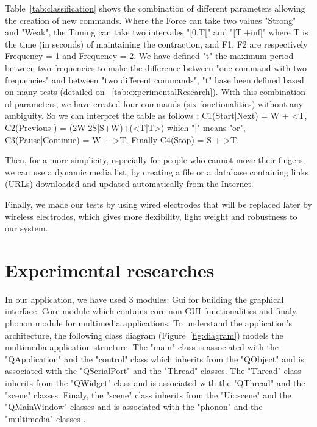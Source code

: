 \documentclass[conference]{IEEEtran}
\begin{document}
Table~\ref{tab:classification} shows the combination of different parameters allowing the creation of new commands. Where the Force can take two values 
"Strong" and "Weak", the Timing can take two intervales "[0,T[" and "[T,+inf[" where T is the time (in seconds) of maintaining the contraction, and F1, F2 are
respectively Frequency = 1 and Frequency = 2. We have defined "t" the maximum period between two frequencies to make the difference
between "one command with two frequencies" and between "two different commands", "t" hase been defined based on many tests (detailed on ~\ref{tab:experimentalResearch}).
With this combination of parameters, we have created four commands (six fonctionalities) without any ambiguity.
So we can interpret the table as follows : C1(Start|Next) =  W + <T, C2(Previous
) = (2W|2S|S+W)+(<T|T>) which "|" means "or", C3(Pause|Continue) = W + >T, Finally C4(Stop) = S + >T.\par
Then, for a more simplicity, especially for people who cannot move their fingers, we can use a dynamic media list, by creating a file or a database containing
links (URLs) downloaded and updated automatically from the Internet.\par
Finally, we made our tests by using wired electrodes that will be replaced later by wireless electrodes, which gives more flexibility, 
light weight and robustness to our system.\par



\section{Experimental researches} \label{sec:experimentalResearch}
In our application, we have used 3 modules: Gui for building the graphical interface, Core module which contains core non-GUI functionalities and finaly,
phonon module for multimedia applications.
To understand the application's architecture, the following class diagram (Figure~\ref{fig:diagram}) models the multimedia application structure. 
The "main" class is associated with the "QApplication" and the "control" class which inherits from the "QObject" and is associated with the "QSerialPort"
and the "Thread" classes. The "Thread" class inherits from the "QWidget" class and is associated with the "QThread" and the "scene" classes. Finaly, the 
"scene" class inherits from the "Ui::scene" and the "QMainWindow" classes  and is associated with the "phonon" and the "multimedia" classes .
\end{document}
